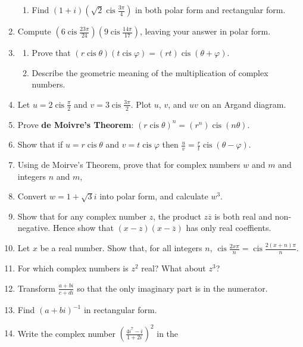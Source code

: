 \documentclass[a4paper,10pt,titlepage]{article}
\theoremstyle{definition}
\DeclareMathOperator{\cis}{cis}
\begin{document}
\begin{enumerate}
\begin{enumerate}
          \item Find $ (1 + i)(\sqrt{2} \cis \frac{3\pi}{4}) $ in both polar form and rectangular form.
        \end{enumerate}
  \item Compute $ (6 \cis \frac{23\pi}{24})(9\cis \frac{14\pi}{17}) $, leaving your answer in polar form.
  \item \begin{enumerate}
          \item Prove that $ (r \cis \theta)(t \cis \varphi) = (rt) \cis (\theta + \varphi) $.
          \item Describe the geometric meaning of the multiplication of complex numbers.
        \end{enumerate}
  \item Let $ u = 2 \cis \frac{\pi}{2} $ and $ v = 3 \cis \frac{3\pi}{2} $. Plot $ u $, $ v $, and $ uv $ on an Argand diagram.
  \item Prove \textbf{de Moivre's Theorem}: $ (r \cis \theta)^n = (r^n) \cis (n\theta) $.
  \item Show that if $ u = r \cis \theta $ and $ v = t \cis \varphi $ then $ \frac{u}{v} = \frac{r}{t}\cis(\theta - \varphi) $.
  \item Using de Moirve's Theorem, prove that for complex numbers $ w $ and $ m $ and integers $ n $ and $ m $,
  \item Convert $ w = 1 + \sqrt{3}i $ into polar form, and calculate $ w^3 $.
  \item Show that for any complex number $ z $, the product $ z \overline z $ is both real and non-negative.
        Hence show that $ (x - z)(x - \overline z) $ has only real coeffients.
  \item Let $ x $ be a real number. Show that, for all integers $ n $, $ \cis \frac{2x\pi}{n} = \cis \frac{2(x + n)\pi}{n} $.
  \item For which complex numbers is $ z^2 $ real? What about $ z^3 $?
  \item Transform $ \frac{a+bi}{c+di} $ so that the only imaginary part is in the numerator.
  \item Find $ (a+bi)^{-1} $ in rectangular form.
  \item Write the complex number $ \left( \frac{4i^7 - i}{1+2i} \right)^2 $ in the

\end{enumerate}
\end{document}
